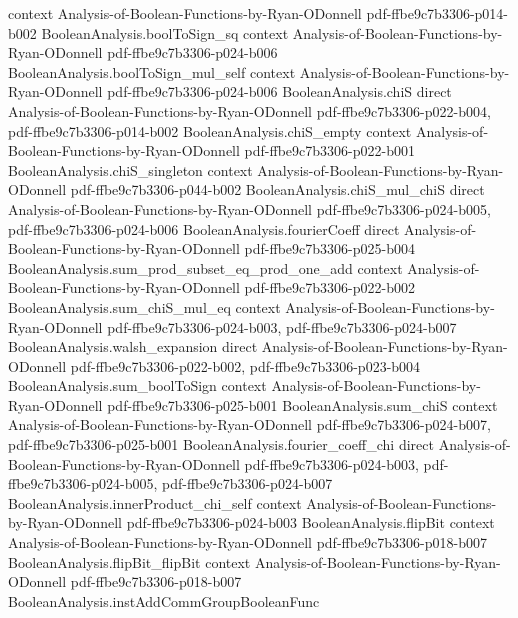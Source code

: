 \begin{lemma}
  {context}
  {Analysis-of-Boolean-Functions-by-Ryan-ODonnell}
  {pdf-ffbe9c7b3306-p014-b002}
\proofstep
  {BooleanAnalysis.boolToSign_sq}
  {context}
  {Analysis-of-Boolean-Functions-by-Ryan-ODonnell}
  {pdf-ffbe9c7b3306-p024-b006}
\proofstep
  {BooleanAnalysis.boolToSign_mul_self}
  {context}
  {Analysis-of-Boolean-Functions-by-Ryan-ODonnell}
  {pdf-ffbe9c7b3306-p024-b006}
\proofstep
  {BooleanAnalysis.chiS}
  {direct}
  {Analysis-of-Boolean-Functions-by-Ryan-ODonnell}
  {pdf-ffbe9c7b3306-p022-b004,
    pdf-ffbe9c7b3306-p014-b002}
\proofstep
  {BooleanAnalysis.chiS_empty}
  {context}
  {Analysis-of-Boolean-Functions-by-Ryan-ODonnell}
  {pdf-ffbe9c7b3306-p022-b001}
\proofstep
  {BooleanAnalysis.chiS_singleton}
  {context}
  {Analysis-of-Boolean-Functions-by-Ryan-ODonnell}
  {pdf-ffbe9c7b3306-p044-b002}
\proofstep
  {BooleanAnalysis.chiS_mul_chiS}
  {direct}
  {Analysis-of-Boolean-Functions-by-Ryan-ODonnell}
  {pdf-ffbe9c7b3306-p024-b005,
    pdf-ffbe9c7b3306-p024-b006}
\proofstep
  {BooleanAnalysis.fourierCoeff}
  {direct}
  {Analysis-of-Boolean-Functions-by-Ryan-ODonnell}
  {pdf-ffbe9c7b3306-p025-b004}
\proofstep
  {BooleanAnalysis.sum_prod_subset_eq_prod_one_add}
  {context}
  {Analysis-of-Boolean-Functions-by-Ryan-ODonnell}
  {pdf-ffbe9c7b3306-p022-b002}
\proofstep
  {BooleanAnalysis.sum_chiS_mul_eq}
  {context}
  {Analysis-of-Boolean-Functions-by-Ryan-ODonnell}
  {pdf-ffbe9c7b3306-p024-b003,
    pdf-ffbe9c7b3306-p024-b007}
\proofstep
  {BooleanAnalysis.walsh_expansion}
  {direct}
  {Analysis-of-Boolean-Functions-by-Ryan-ODonnell}
  {pdf-ffbe9c7b3306-p022-b002,
    pdf-ffbe9c7b3306-p023-b004}
\proofstep
  {BooleanAnalysis.sum_boolToSign}
  {context}
  {Analysis-of-Boolean-Functions-by-Ryan-ODonnell}
  {pdf-ffbe9c7b3306-p025-b001}
\proofstep
  {BooleanAnalysis.sum_chiS}
  {context}
  {Analysis-of-Boolean-Functions-by-Ryan-ODonnell}
  {pdf-ffbe9c7b3306-p024-b007,
    pdf-ffbe9c7b3306-p025-b001}
\proofstep
  {BooleanAnalysis.fourier_coeff_chi}
  {direct}
  {Analysis-of-Boolean-Functions-by-Ryan-ODonnell}
  {pdf-ffbe9c7b3306-p024-b003,
    pdf-ffbe9c7b3306-p024-b005,
    pdf-ffbe9c7b3306-p024-b007}
\proofstep
  {BooleanAnalysis.innerProduct_chi_self}
  {context}
  {Analysis-of-Boolean-Functions-by-Ryan-ODonnell}
  {pdf-ffbe9c7b3306-p024-b003}
\proofstep
  {BooleanAnalysis.flipBit}
  {context}
  {Analysis-of-Boolean-Functions-by-Ryan-ODonnell}
  {pdf-ffbe9c7b3306-p018-b007}
\proofstep
  {BooleanAnalysis.flipBit_flipBit}
  {context}
  {Analysis-of-Boolean-Functions-by-Ryan-ODonnell}
  {pdf-ffbe9c7b3306-p018-b007}
\proofstep
  {BooleanAnalysis.instAddCommGroupBooleanFunc}

\end{lemma}
